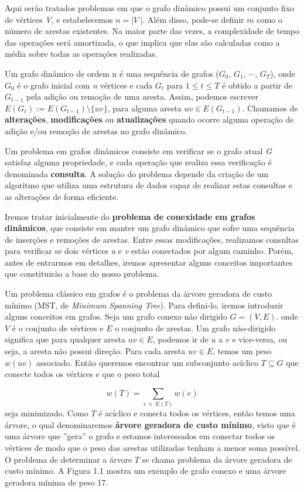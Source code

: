 Aqui serão tratados problemas em que o grafo dinâmico possui um conjunto fixo de vértices \textit{V}, e estabelecemos $n = |\textit{V}\ |$. Além disso, pode-se definir $m$ como o número de arestas existentes. Na maior parte das vezes, a complexidade de tempo das operações será amortizada, o que implica que elas são calculadas como a média sobre todas as operações realizadas. 


Um grafo dinâmico de ordem n é uma sequência de grafos ($G_0$, $G_1$, $\cdots$, $G_T$), onde $G_0$ é o grafo inicial com \textit{n} vértices e cada $G_t$ para $1 \leq t \leq T$ é obtido a partir de $G_{t-1}$ pela adição ou remoção de uma aresta. Assim, podemos escrever $E(G_{t}) := E(G_{t - 1}) \setminus \{uv\}$, para alguma aresta $uv \in E(G_{t-1})$. Chamamos de \textbf{alterações}, \textbf{modificações} ou \textbf{atualizações} quando ocorre alguma operação de adição e/ou remoção de arestas no grafo dinâmico.

Um problema em grafos dinâmicos consiste em verificar se o grafo atual \textit{G} satisfaz alguma propriedade, e cada operação que realiza essa verificação é denominada \textbf{consulta}. A solução do problema depende da criação de um algoritmo que utiliza uma estrutura de dados capaz de realizar estas consultas e as alterações de forma eficiente. 

Iremos tratar inicialmente do \textbf{problema de conexidade em grafos dinâmicos}, que consiste em manter um grafo dinâmico que sofre uma sequência de inserções e remoções de arestas. Entre essas modificações, realizamos consultas para verificar se dois vértices \textit{u} e \textit{v} estão conectados por algum caminho. Porém, antes de entrarmos em detalhes, iremos apresentar alguns conceitos importantes que constituirão a base do nosso problema. 

Um problema clássico em grafos é o problema da árvore geradora de custo mínimo (MST, de \textit{Minimum Spanning Tree}). Para defini-lo, iremos introduzir alguns conceitos em grafos. Seja um grafo conexo não dirigido $G = (V, E)$. onde $V$ é o conjunto de vértices e $E$ o conjunto de arestas. Um grafo não-dirigido significa que para qualquer aresta $uv \in E$, podemos ir de $u$ a $v$ e vice-versa, ou seja, a aresta não possui direção. Para cada aresta $uv \in E$, temos um peso $w(uv)$ associado. Então queremos encontrar um subconjunto acíclico $T \subseteq G$ que conecte todos os vértices e que o peso total 

$$
w(T) = \sum_{e \,\in\, E(T)} w(e)
$$
seja minimizado. Como $T$ é acíclico e conecta todos os vértices, então temos uma árvore, o qual denominaremos \textbf{árvore geradora de custo mínimo}, visto que é uma árvore que ''gera'' o grafo e estamos interessados em conectar todos os vértices de modo que o peso das arestas utilizadas tenham a menor soma possível. O problema de determinar a árvore $T$ se chama problema da árvore geradora de custo mínimo. A Figura 1.1 mostra um exemplo de grafo conexo e uma árvore geradora mínima de peso 17.

